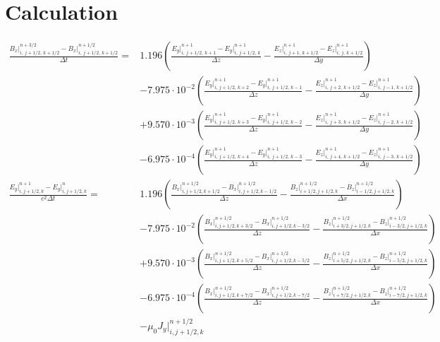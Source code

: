 \documentclass[bachelor_thesis]{subfiles}
\begin{document}
\appendix
\chapter{Calculation} \label{chap:numMaxwell}
\begin{align*}
\frac{{B}_x\rvert_{i,\, j+1/2,\, k+1/2}^{n+3/2} - {B}_x\rvert_{i,\, j+1/2,\, k+1/2}^{n+1/2}}{\Delta t}
	=& 1.196 \left(\frac{{E}_y\rvert_{i,\, j+1/2,\, k+1}^{n+1} - {E}_y\rvert_{i,\, j+1/2,\, k}^{n+1}}{\Delta z}
	- \frac{{E}_z\rvert_{i,\, j+1,\, k+1/2}^{n+1} - {E}_z\rvert_{i,\, j,\, k+1/2}^{n+1}}{\Delta y}\right)			\\&
	- 7.975\cdot 10^{-2} \left(\frac{{E}_y\rvert_{i,\, j+1/2,\, k+2}^{n+1} - {E}_y\rvert_{i,\, j+1/2,\, k-1}^{n+1}}{\Delta z}
	- \frac{{E}_z\rvert_{i,\, j+2,\, k+1/2}^{n+1} - {E}_z\rvert_{i,\, j-1,\, k+1/2}^{n+1}}{\Delta y}\right)			\\&
	+ 9.570\cdot 10^{-3} \left(\frac{{E}_y\rvert_{i,\, j+1/2,\, k+3}^{n+1} - {E}_y\rvert_{i,\, j+1/2,\, k-2}^{n+1}}{\Delta z}
	- \frac{{E}_z\rvert_{i,\, j+3,\, k+1/2}^{n+1} - {E}_z\rvert_{i,\, j-2,\, k+1/2}^{n+1}}{\Delta y}\right)			\\&
	- 6.975\cdot 10^{-4} \left(\frac{{E}_y\rvert_{i,\, j+1/2,\, k+4}^{n+1} - {E}_y\rvert_{i,\, j+1/2,\, k-3}^{n+1}}{\Delta z}
	- \frac{{E}_z\rvert_{i,\, j+4,\, k+1/2}^{n+1} - {E}_z\rvert_{i,\, j-3,\, k+1/2}^{n+1}}{\Delta y}\right)			\\
\frac{E_y\rvert_{i, j+1/2, k}^{n+1} - E_y\rvert_{i, j+1/2, k}^{n}}{c^2 \Delta t} 
	=& 1.196 \left(\frac{B_x\rvert_{i, j+1/2, k+1/2}^{n+1/2} - B_x\rvert_{i, j+1/2, k-1/2}^{n+1/2}}{\Delta z}
	 - \frac{B_z\rvert_{i+1/2, j+1/2, k}^{n+1/2} - B_z\rvert_{i-1/2, j+1/2, k}^{n+1/2}}{\Delta x}\right)			\\&
 	- 7.975\cdot 10^{-2} \left(\frac{B_x\rvert_{i, j+1/2, k+3/2}^{n+1/2} - B_x\rvert_{i, j+1/2, k-3/2}^{n+1/2}}{\Delta z}
 	 -\frac{B_z\rvert_{i+3/2, j+1/2, k}^{n+1/2} - B_z\rvert_{i-3/2, j+1/2, k}^{n+1/2}}{\Delta x}\right)			\\&
 	+ 9.570\cdot 10^{-3} \left(\frac{B_x\rvert_{i, j+1/2, k+5/2}^{n+1/2} - B_x\rvert_{i, j+1/2, k-5/2}^{n+1/2}}{\Delta z}
 	- \frac{B_z\rvert_{i+5/2, j+1/2, k}^{n+1/2} - B_z\rvert_{i-5/2, j+1/2, k}^{n+1/2}}{\Delta x}\right)			\\&
 	- 6.975\cdot 10^{-4} \left(\frac{B_x\rvert_{i, j+1/2, k+7/2}^{n+1/2} - B_x\rvert_{i, j+1/2, k-7/2}^{n+1/2}}{\Delta z}
	-\frac{B_z\rvert_{i+7/2, j+1/2, k}^{n+1/2} - B_z\rvert_{i-7/2, j+1/2, k}^{n+1/2}}{\Delta x}\right)			\\&
 	- \mu_0 J_y\rvert_{i, j+1/2, k}^{n+1/2}
\end{align*}
\end{document}
